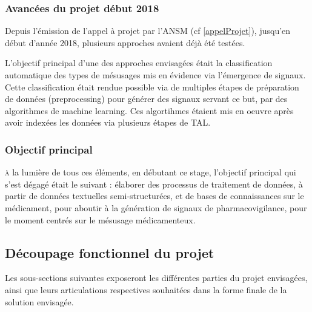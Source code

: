 \documentclass[a4paper, 12pt, openany, oneside, abstract=on]{article} %
\begin{document}
\subsubsection{Avancées du projet début 2018}
Depuis l'émission de l'appel à projet par l'ANSM (cf \ref{appelProjet}), jusqu'en début d'année 2018, plusieurs approches avaient déjà été testées.

L'objectif principal d'une des approches envisagées était la classification automatique des types de mésusages mis en évidence via l'émergence de signaux. Cette classification était rendue possible via de multiples étapes de préparation de données (preprocessing) pour générer des signaux servant ce but, par des algorithmes de machine learning. Ces algortihmes étaient mis en oeuvre après avoir indexées les données via plusieurs étapes de TAL\cite{Bigeard2018}.

\subsubsection{Objectif principal}
\textsc{à} la lumière de tous ces éléments, en débutant ce stage, l'objectif principal qui s'est dégagé était le suivant : élaborer des processus de traitement de données, à partir de données textuelles semi-structurées, et de bases de connaissances sur le médicament, pour aboutir à la génération de signaux de pharmacovigilance, pour le moment centrés sur le mésusage médicamenteux.

\subsection{Découpage fonctionnel du projet}
Les sous-sections suivantes exposeront les différentes parties du projet envisagées, ainsi que leurs articulations respectives souhaitées dans la forme finale de la solution envisagée.
\end{document}
